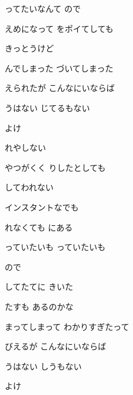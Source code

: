 \documentclass[a4paper,tate,twocolumn,12pt]{ltjtarticle}
\begin{document}
\begin{flushleft}
\noindent\begin{minipage}{\linewidth}
ってたいなんて  ので

えめになって をポイてしても

きっとうけど

んでしまった づいてしまった

えられたが こんなにいならば

うはない じてるもない

よけ
\end{minipage}

\vspace{2em}

\noindent\begin{minipage}{\linewidth}
れやしない

やつがくく りしたとしても

してわれない

インスタントなでも

れなくても にある
\end{minipage}

\vspace{2em}

\noindent\begin{minipage}{\linewidth}
っていたいも っていたいも

ので

してたてに きいた

たすも あるのかな
\end{minipage}

\vspace{2em}

\noindent\begin{minipage}{\linewidth}
まってしまって わかりすぎたって

びえるが こんなにいならば

うはない しうもない

よけ
\end{minipage}

\end{flushleft}
\end{document}
